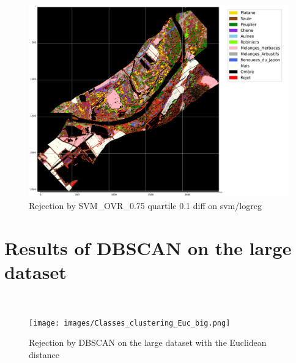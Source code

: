 \documentclass{siamart171218}
\begin{document}
\begin{appendices}
\newline
\begin{figure}[H]
    \centering
    \includegraphics[width=18cm]{images/Classes_clustering_SVM.png}
    \caption{Rejection by SVM\_OVR\_0.75 quartile 0.1 diff on svm/logreg}
    \label{Classes_clustering_SVM}
\end{figure}


\newpage

\section{Results of DBSCAN on the large dataset} \\[1cm]
\newline
\begin{figure}[H]
    \centering
    \texttt{[image: images/Classes\_clustering\_Euc\_big.png]}
    \caption{Rejection by DBSCAN on the large dataset with the Euclidean distance}
    \label{Classes_clustering_Euc_big}
\end{figure}

\newpage





\end{appendices}
\end{document}
